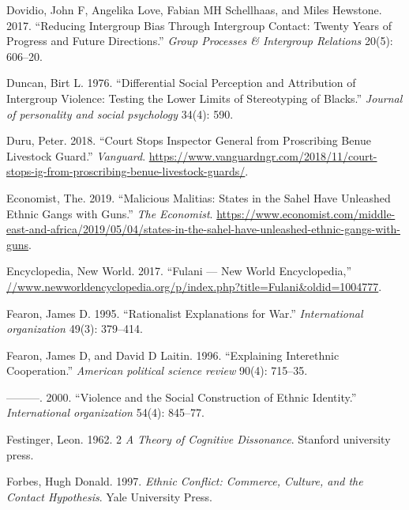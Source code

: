 \documentclass[11pt]{article}
\begin{document}
\leavevmode\hypertarget{ref-dovidio2017reducing}{}%
Dovidio, John F, Angelika Love, Fabian MH Schellhaas, and Miles
Hewstone. 2017. ``Reducing Intergroup Bias Through Intergroup Contact:
Twenty Years of Progress and Future Directions.'' \emph{Group Processes
\& Intergroup Relations} 20(5): 606--20.

\leavevmode\hypertarget{ref-duncan1976differential}{}%
Duncan, Birt L. 1976. ``Differential Social Perception and Attribution
of Intergroup Violence: Testing the Lower Limits of Stereotyping of
Blacks.'' \emph{Journal of personality and social psychology} 34(4):
590.

\leavevmode\hypertarget{ref-duru2018court}{}%
Duru, Peter. 2018. ``Court Stops Inspector General from Proscribing
Benue Livestock Guard.'' \emph{Vanguard}.
\url{https://www.vanguardngr.com/2018/11/court-stops-ig-from-proscribing-benue-livestock-guards/}.

\leavevmode\hypertarget{ref-economist2019militias}{}%
Economist, The. 2019. ``Malicious Malitias: States in the Sahel Have
Unleashed Ethnic Gangs with Guns.'' \emph{The Economist}.
\url{https://www.economist.com/middle-east-and-africa/2019/05/04/states-in-the-sahel-have-unleashed-ethnic-gangs-with-guns}.

\leavevmode\hypertarget{ref-fulanisize2017}{}%
Encyclopedia, New World. 2017. ``Fulani --- New World Encyclopedia,''
\url{//www.newworldencyclopedia.org/p/index.php?title=Fulani\&oldid=1004777}.

\leavevmode\hypertarget{ref-fearon1995rationalist}{}%
Fearon, James D. 1995. ``Rationalist Explanations for War.''
\emph{International organization} 49(3): 379--414.

\leavevmode\hypertarget{ref-fearon1996explaining}{}%
Fearon, James D, and David D Laitin. 1996. ``Explaining Interethnic
Cooperation.'' \emph{American political science review} 90(4): 715--35.

\leavevmode\hypertarget{ref-fearon2000violence}{}%
---------. 2000. ``Violence and the Social Construction of Ethnic
Identity.'' \emph{International organization} 54(4): 845--77.

\leavevmode\hypertarget{ref-festinger1962cognitiveDissonance}{}%
Festinger, Leon. 1962. 2 \emph{A Theory of Cognitive Dissonance}.
Stanford university press.

\leavevmode\hypertarget{ref-forbes1997ethnic}{}%
Forbes, Hugh Donald. 1997. \emph{Ethnic Conflict: Commerce, Culture, and
the Contact Hypothesis}. Yale University Press.
\end{document}
